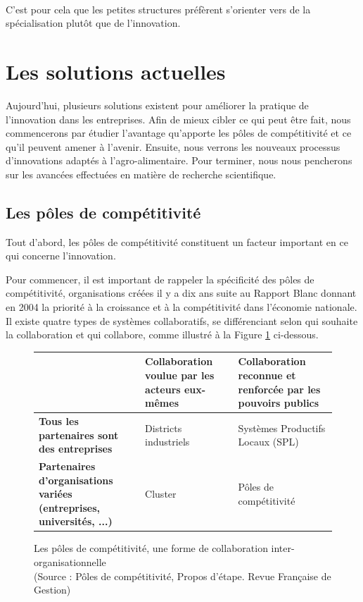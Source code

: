 \documentclass[a4paper,12pt]{report}
\begin{document}
		\paragraph{}C'est pour cela que les petites structures préfèrent s'orienter vers de la spécialisation plutôt que de l'innovation.
	
	\section{Les solutions actuelles}
		Aujourd’hui, plusieurs solutions existent pour améliorer la pratique de l’innovation dans les entreprises. Afin de mieux cibler ce qui peut être fait, nous commencerons par étudier l’avantage qu’apporte les pôles de compétitivité et ce qu’il peuvent amener à l’avenir. Ensuite, nous verrons les nouveaux processus d’innovations adaptés à l’agro-alimentaire. Pour terminer, nous nous pencherons sur les avancées effectuées en matière de recherche scientifique.
		
		\subsection{Les pôles de compétitivité}
		Tout d’abord, les pôles de compétitivité constituent un facteur important en ce qui concerne l’innovation.
		
		Pour commencer, il est important de rappeler la spécificité des pôles de compétitivité, organisations créées il y a dix ans suite au Rapport Blanc donnant en 2004 la priorité à la croissance et à la compétitivité dans l’économie nationale\cite{RapportBlanc}. Il existe quatre types de systèmes collaboratifs, se différenciant selon qui souhaite la collaboration et qui collabore, comme illustré à la Figure  \ref{ComparaisonSystemesCollaboratifs} ci-dessous.
	
		\begin{figure}[!h]		
		
		\vspace{11pt}
		\begin{center}
		\begin{tabular}{|M{110pt}|M{100pt}|M{100pt}|}
			\hline
			& \textbf{Collaboration voulue par les acteurs eux-mêmes} & \textbf{Collaboration reconnue et renforcée par les pouvoirs publics}\\
			\hline
			\textbf{Tous les partenaires sont des entreprises} & Districts industriels & Systèmes Productifs Locaux (SPL)\\
			\hline
			\textbf{Partenaires d'organisations variées (entreprises, universités, ...)} & Cluster & Pôles de compétitivité\\
			\hline
		\end{tabular}
		
		\caption{Les pôles de compétitivité, une forme de collaboration inter-organisationnelle \\(Source : Pôles de compétitivité, Propos d'étape. Revue Française de Gestion\cite{PoleCompetitivite})}
		
		\label{ComparaisonSystemesCollaboratifs}
		\end{center}
		\end{figure}
		
\end{document}
